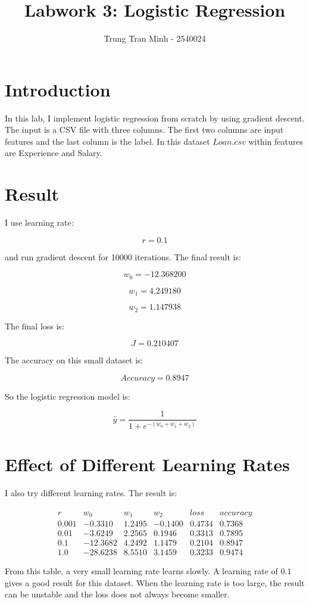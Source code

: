 \documentclass[12pt]{article}
\title{Labwork 3: Logistic Regression}
\author{Trung Tran Minh - 2540024}
\date{}
\begin{document}
\maketitle

\section{Introduction}

In this lab, I implement logistic regression from scratch by using gradient descent.
The input is a CSV file with three columns. The first two columns are input features and the last column is the label.
In this dataset $Loan.csv$ within features are Experience and Salary.

\section{Result}

I use learning rate:

\[
r = 0.1
\]

and run gradient descent for 10000 iterations.
The final result is:

\[
w_0 = -12.368200
\]

\[
w_1 = 4.249180
\]

\[
w_2 = 1.147938
\]

The final loss is:

\[
J = 0.210407
\]

The accuracy on this small dataset is:

\[
Accuracy = 0.8947
\]

So the logistic regression model is:

\[
\hat{y} = \frac{1}{1 + e^{-(w_0 + w_1 + w_2)}}
\]

\section{Effect of Different Learning Rates}

I also try different learning rates. The result is:

\[
\begin{array}{c|c|c|c|c|c}
r & w_0 & w_1 & w_2 & loss & accuracy \\
\hline
0.001 & -0.3310 & 1.2495 & -0.1400 & 0.4734 & 0.7368 \\
0.01 & -3.6249 & 2.2565 & 0.1946 & 0.3313 & 0.7895 \\
0.1 & -12.3682 & 4.2492 & 1.1479 & 0.2104 & 0.8947 \\
1.0 & -28.6238 & 8.5510 & 3.1459 & 0.3233 & 0.9474
\end{array}
\]

From this table, a very small learning rate learns slowly.
A learning rate of $0.1$ gives a good result for this dataset.
When the learning rate is too large, the result can be unstable and the loss does not always become smaller.
\end{document}
